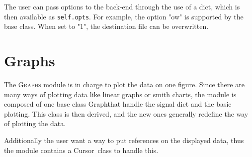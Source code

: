 \documentclass[a4paper,11pt]{article}
\newcommand{\att}[1]{\texttt{#1}}
\newcommand{\cls}[1]{\textsf{#1}}
\newcommand{\module}[1]{\textsc{#1}}
\newcommand{\graph}{\cls{Graph}}
\newcommand{\cursor}{\cls{Cursor}}
\begin{document}
The user can pass options to the back-end through the use of a dict, which is then available as \att{self.opts}.
For example, the option "ow" is supported by the base class.
When set to "1", the destination file can be overwritten.

\section{Graphs}
\label{sec:graphs}
The \module{Graphs} module is in charge to plot the data on one figure.
Since there are many ways of plotting data like linear graphs or smith charts, the module is composed of one base class \graph that handle the signal dict and the basic plotting.
This class is then derived, and the new ones generally redefine the way of plotting the data.

Additionally the user want a way to put references on the displayed data, thus the module contains a \cursor\ class to handle this.
\end{document}

